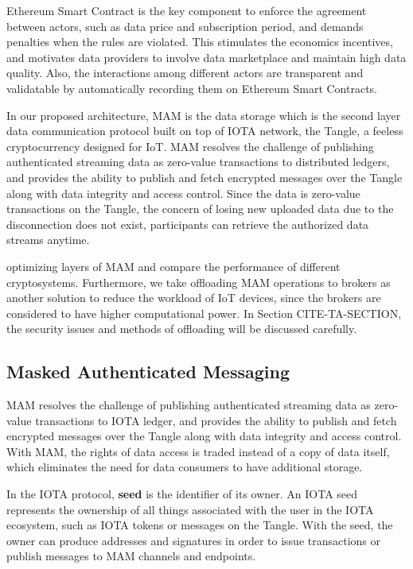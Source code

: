 Ethereum Smart Contract is the key component to enforce the agreement between actors, such as data price and subscription period, and demands penalties when the rules are violated. This stimulates the economics incentives, and motivates data providers to involve data marketplace and maintain high data quality. Also, the interactions among different actors are transparent and validatable by automatically recording them on Ethereum Smart Contracts.

In our proposed architecture, MAM is the data storage which is the second layer data communication protocol built on top of IOTA\cite{IOTAwhitepaper} network, the Tangle, a feeless cryptocurrency designed for IoT. MAM resolves the challenge of publishing authenticated streaming data as zero-value transactions to distributed ledgers, and provides the ability to publish and fetch encrypted messages over the Tangle along with data integrity and access control. Since the data is zero-value transactions on the Tangle, the concern of losing new uploaded data due to the disconnection does not exist, participants can retrieve the authorized data streams anytime.

optimizing layers of MAM and compare the performance of different cryptosystems. Furthermore, we take offloading MAM operations to brokers as another solution to reduce the workload of IoT devices, since the brokers are considered to have higher computational power. In Section CITE-TA-SECTION, the security issues and methods of offloading will be discussed carefully.

\subsection{Masked Authenticated Messaging}
MAM resolves the challenge of publishing authenticated streaming data as zero-value transactions to IOTA ledger, and provides the ability to publish and fetch encrypted messages over the Tangle along with data integrity and access control. With MAM, the rights of data access is traded instead of a copy of data itself, which eliminates the need for data consumers to have additional storage.
 
In the IOTA protocol, \textbf{seed} is the identifier of its owner. An IOTA seed represents the ownership of all things associated with the user in the IOTA ecosystem, such as IOTA tokens or messages on the Tangle. With the seed, the owner can produce addresses and signatures in order to issue transactions or publish messages to MAM channels and endpoints.

